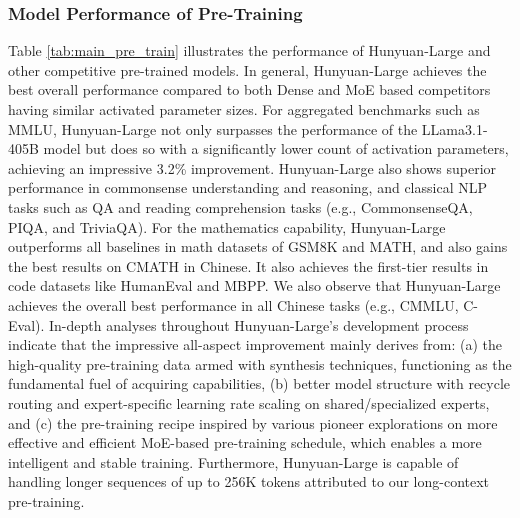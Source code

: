 \documentclass{article}
\begin{document}
\subsubsection{Model Performance of Pre-Training}

Table \ref{tab:main_pre_train} illustrates the performance of Hunyuan-Large and other competitive pre-trained models. In general, Hunyuan-Large achieves the best overall performance compared to both Dense and MoE based competitors having similar activated parameter sizes.
For aggregated benchmarks such as MMLU, Hunyuan-Large not only surpasses the performance of the LLama3.1-405B model but does so with a significantly lower count of activation parameters, achieving an impressive 3.2\% improvement. Hunyuan-Large also shows superior performance in commonsense understanding and reasoning, and classical NLP tasks such as QA and reading comprehension tasks (e.g., CommonsenseQA, PIQA, and TriviaQA). For the mathematics capability, Hunyuan-Large outperforms all baselines in math datasets of GSM8K and MATH, and also gains the best results on CMATH in Chinese. It also achieves the first-tier results in code datasets like HumanEval and MBPP. We also observe that Hunyuan-Large achieves the overall best performance in all Chinese tasks (e.g., CMMLU, C-Eval).
In-depth analyses throughout Hunyuan-Large's development process indicate that the impressive all-aspect improvement mainly derives from: (a) the high-quality pre-training data armed with synthesis techniques, functioning as the fundamental fuel of acquiring capabilities, (b) better model structure with recycle routing and expert-specific learning rate scaling on shared/specialized experts, and (c) the pre-training recipe inspired by various pioneer explorations on more effective and efficient MoE-based pre-training schedule, which enables a more intelligent and stable training. Furthermore, Hunyuan-Large is capable of handling longer sequences of up to 256K tokens attributed to our long-context pre-training. 
\end{document}
